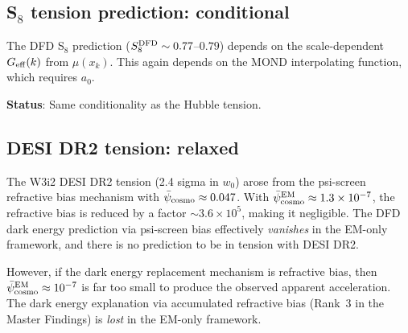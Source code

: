 \documentclass[11pt]{article}
\newcommand{\ee}[1]{\times 10^{#1}}
\newcommand{\psicosmo}{\bar{\psi}_{\rm cosmo}}
\begin{document}
\subsection{S$_8$ tension prediction: conditional}

The DFD S$_8$ prediction ($S_8^{\rm DFD} \sim 0.77$--$0.79$) depends on
the scale-dependent $G_{\rm eff}(k)$ from $\mu(x_k)$. This again depends
on the MOND interpolating function, which requires $a_0$.

\textbf{Status}: Same conditionality as the Hubble tension.

\subsection{DESI DR2 tension: relaxed}

The W3i2 DESI DR2 tension (2.4 sigma in $w_0$) arose from the psi-screen
refractive bias mechanism with $\psicosmo \approx 0.047$. With
$\psicosmo^{\rm EM} \approx 1.3\ee{-7}$, the refractive bias is
reduced by a factor $\sim 3.6\ee{5}$, making it negligible. The DFD
dark energy prediction via psi-screen bias effectively \emph{vanishes}
in the EM-only framework, and there is no prediction to be in tension
with DESI DR2.

However, if the dark energy replacement mechanism is refractive bias,
then $\psicosmo^{\rm EM} \approx 10^{-7}$ is far too small to produce
the observed apparent acceleration. The dark energy explanation via
accumulated refractive bias (Rank~3 in the Master Findings) is
\emph{lost} in the EM-only framework.
\end{document}
